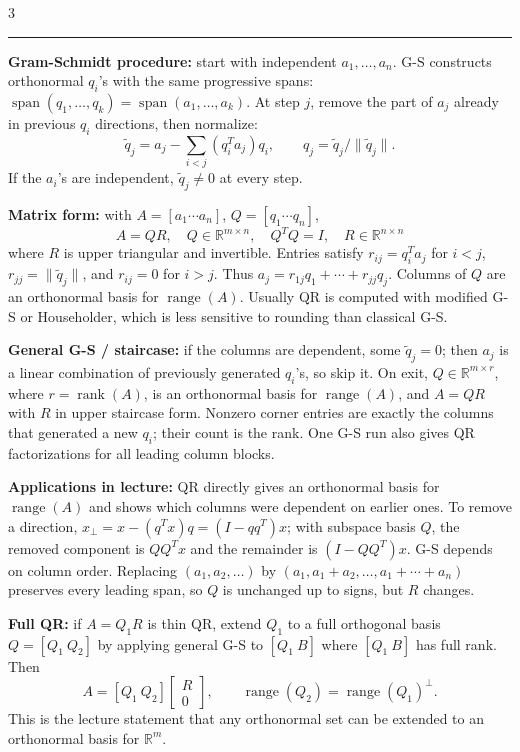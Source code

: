 \documentclass[10pt]{article}
\newcommand{\sect}[1]{\vspace{0.9pt}{\fontsize{7.2}{7.5}\selectfont\textbf{#1}}\vspace{0.25pt}\hrule\vspace{0.8pt}}
\newcommand{\sub}[1]{\textbf{#1}}
\newcommand{\R}{\mathbb{R}}
\newcommand{\rank}{\operatorname{rank}}
\newcommand{\range}{\operatorname{range}}
\begin{document}
\begin{multicols*}{3}
\sect{QR Factorization}
\sub{Gram-Schmidt procedure:} start with independent
\(a_1,\ldots,a_n\). G-S constructs orthonormal \(q_i\)'s with the same
progressive spans:
\(\operatorname{span}(q_1,\ldots,q_k)=
\operatorname{span}(a_1,\ldots,a_k)\). At step \(j\), remove the part of
\(a_j\) already in previous \(q_i\) directions, then normalize:
\[
\tilde q_j=a_j-\sum_{i<j}(q_i^Ta_j)q_i,\qquad
q_j=\tilde q_j/\|\tilde q_j\|.
\]
If the \(a_i\)'s are independent, \(\tilde q_j\ne0\) at every step.

\sub{Matrix form:} with \(A=[a_1\cdots a_n]\), \(Q=[q_1\cdots q_n]\),
\[
A=QR,\quad Q\in\R^{m\times n},\quad Q^TQ=I,\quad
R\in\R^{n\times n}
\]
where \(R\) is upper triangular and invertible. Entries satisfy
\(r_{ij}=q_i^Ta_j\) for \(i<j\), \(r_{jj}=\|\tilde q_j\|\), and
\(r_{ij}=0\) for \(i>j\). Thus \(a_j=r_{1j}q_1+\cdots+r_{jj}q_j\).
Columns of \(Q\) are an orthonormal basis for \(\range(A)\). Usually QR
is computed with modified G-S or Householder, which is less sensitive to
rounding than classical G-S.

\sub{General G-S / staircase:} if the columns are dependent, some
\(\tilde q_j=0\); then \(a_j\) is a linear combination of previously
generated \(q_i\)'s, so skip it. On exit, \(Q\in\R^{m\times r}\), where
\(r=\rank(A)\), is an orthonormal basis for \(\range(A)\), and
\(A=QR\) with \(R\) in upper staircase form. Nonzero corner entries are
exactly the columns that generated a new \(q_i\); their count is the rank.
One G-S run also gives QR factorizations for all leading column blocks.

\sub{Applications in lecture:} QR directly gives an orthonormal basis for
\(\range(A)\) and shows which columns were dependent on earlier ones. To
remove a direction, \(x_\perp=x-(q^Tx)q=(I-qq^T)x\); with subspace basis
\(Q\), the removed component is \(QQ^Tx\) and the remainder is
\((I-QQ^T)x\). G-S depends on column order. Replacing
\((a_1,a_2,\ldots)\) by \((a_1,a_1+a_2,\ldots,a_1+\cdots+a_n)\) preserves
every leading span, so \(Q\) is unchanged up to signs, but \(R\) changes.

\sub{Full QR:} if \(A=Q_1R\) is thin QR, extend \(Q_1\) to a full
orthogonal basis \(Q=[Q_1\ Q_2]\) by applying general G-S to
\([Q_1\ B]\) where \([Q_1\ B]\) has full rank. Then
\[
A=[Q_1\ Q_2]\begin{bmatrix}R\\0\end{bmatrix},\qquad
\range(Q_2)=\range(Q_1)^\perp .
\]
This is the lecture statement that any orthonormal set can be extended to
an orthonormal basis for \(\R^m\).


\end{multicols*}
\end{document}
